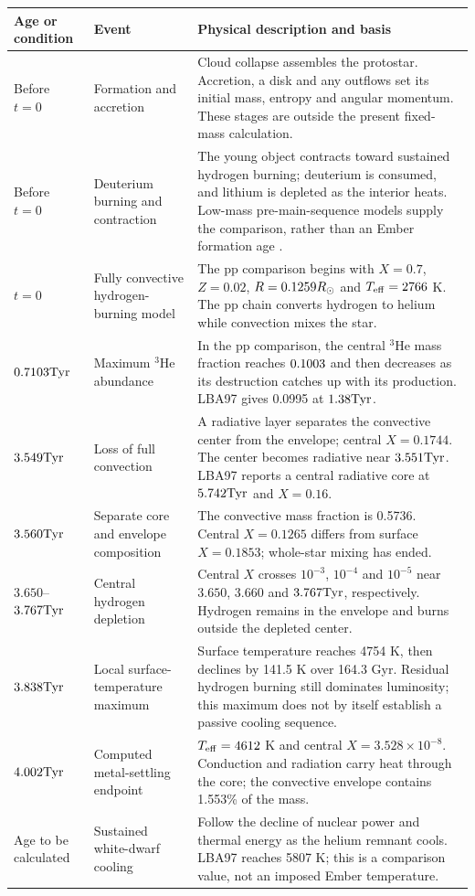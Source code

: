 {\small\renewcommand{\arraystretch}{1.17}
\begin{tabular}{@{}>{\raggedright\arraybackslash}p{}
 >{\raggedright\arraybackslash}p{}
 >{\raggedright\arraybackslash}p{}@{}}
\toprule
Age or condition & Event & Physical description and basis \\\midrule
Before $t=0$ & Formation and accretion &
Cloud collapse assembles the protostar. Accretion, a disk and any outflows
set its initial mass, entropy and angular momentum. These stages are outside
the present fixed-mass calculation. \\[4pt]
Before $t=0$ & Deuterium burning and contraction &
The young object contracts toward sustained hydrogen burning; deuterium is
consumed, and lithium is depleted as the interior heats. Low-mass
pre-main-sequence models supply the comparison, rather than an Ember
formation age \cite{baraffe15}. \\[4pt]
$t=0$ & Fully convective hydrogen-burning model &
The pp comparison begins with $X=0.7$, $Z=0.02$, $R=0.1259R_\odot$ and
$T_{\rm eff}=2766$ K. The pp chain converts hydrogen to helium while
convection mixes the star. \\[4pt]
$0.7103\mathrm{Tyr}$ & Maximum $^3$He abundance &
In the pp comparison, the central $^3$He mass fraction reaches $0.1003$ and
then decreases as its destruction catches up with its production.
LBA97 gives 0.0995 at $1.38\mathrm{Tyr}$. \\[4pt]
$3.549\mathrm{Tyr}$ & Loss of full convection &
A radiative layer separates the convective center from the envelope;
central $X=0.1744$. The center becomes radiative near $3.551\mathrm{Tyr}$.
LBA97 reports a central radiative core at $5.742\mathrm{Tyr}$ and $X=0.16$. \\[4pt]
$3.560\mathrm{Tyr}$ & Separate core and envelope composition &
The convective mass fraction is 0.5736. Central $X=0.1265$ differs from
surface $X=0.1853$; whole-star mixing has ended. \\[4pt]
$3.650$--$3.767\mathrm{Tyr}$ & Central hydrogen depletion &
Central $X$ crosses $10^{-3}$, $10^{-4}$ and $10^{-5}$ near
$3.650$, $3.660$ and $3.767\mathrm{Tyr}$, respectively. Hydrogen remains in the
envelope and burns outside the depleted center. \\[4pt]
$3.838\mathrm{Tyr}$ & Local surface-temperature maximum &
Surface temperature reaches 4754 K, then declines by 141.5 K over
164.3 Gyr. Residual hydrogen burning still dominates luminosity; this
maximum does not by itself establish a passive cooling sequence. \\[4pt]
$4.002\mathrm{Tyr}$ & Computed metal-settling endpoint &
$T_{\rm eff}=4612$ K and central $X=3.528\times10^{-8}$.
Conduction and radiation carry heat through the core; the convective
envelope contains 1.553\% of the mass. \\[4pt]
Age to be calculated & Sustained white-dwarf cooling &
Follow the decline of nuclear power and thermal energy as the helium
remnant cools. LBA97 reaches 5807 K; this is a comparison value, not an
imposed Ember temperature. \\
\bottomrule
\end{tabular}}

